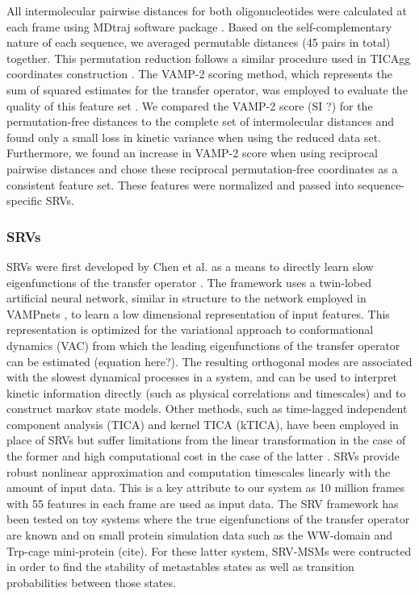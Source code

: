 \documentclass[journal=jpcbfk,manuscript=article]{achemso}
\begin{document}
All intermolecular pairwise distances for both oligonucleotides were calculated at each frame using MDtraj software package \citep{McGibbon2015MDTraj:Trajectories}. Based on the self-complementary nature of each sequence, we averaged permutable distances (45 pairs in total) together. This permutation reduction follows a similar procedure used in TICAgg coordinates construction \citep{Sengupta2019AutomatedSelf-assembly}. The VAMP-2 scoring method, which represents the sum of squared estimates for the transfer operator, was employed to evaluate the quality of this feature set \citep{Mardt2018VAMPnetsKinetics}. We compared the VAMP-2 score (SI ?) for the permutation-free distances to the complete set of intermolecular distances and found only a small loss in kinetic variance when using the reduced data set. Furthermore, we found an increase in VAMP-2 score when using reciprocal pairwise distances and chose these reciprocal permutation-free coordinates as a consistent feature set. These features were normalized and passed into sequence-specific SRVs. 

\subsubsection{\label{sec:methods}SRVs}

SRVs were first developed by Chen et al. as a means to directly learn slow eigenfunctions of the transfer operator \citep{Chen}. The framework uses a twin-lobed artificial neural network, similar in structure to the network employed in VAMPnets \citep{Mardt2018VAMPnetsKinetics}, to learn a low dimensional representation of input features. This representation is optimized for the variational approach to conformational dynamics (VAC) from which the leading eigenfunctions of the transfer operator can be estimated (equation here?). The resulting orthogonal modes are associated with the slowest dynamical processes in a system, and can be used to interpret kinetic information directly (such as physical correlations and timescales) and to construct markov state models. Other methods, such as time-lagged independent component analysis (TICA) and kernel TICA (kTICA), have been employed in place of SRVs but suffer limitations from the linear transformation in the case of the former and high computational cost in the case of the latter \citep{Harrigan2017LandmarkDynamics}. SRVs provide robust nonlinear approximation and computation timescales linearly with the amount of input data. This is a key attribute to our system as 10 million frames with 55 features in each frame are used as input data. The SRV framework has been tested on toy systems where the true eigenfunctions of the transfer operator are known and on small protein simulation data such as the WW-domain and Trp-cage mini-protein (cite). For these latter system, SRV-MSMs were contructed in order to find the stability of metastables states as well as transition probabilities between those states.
\end{document}
